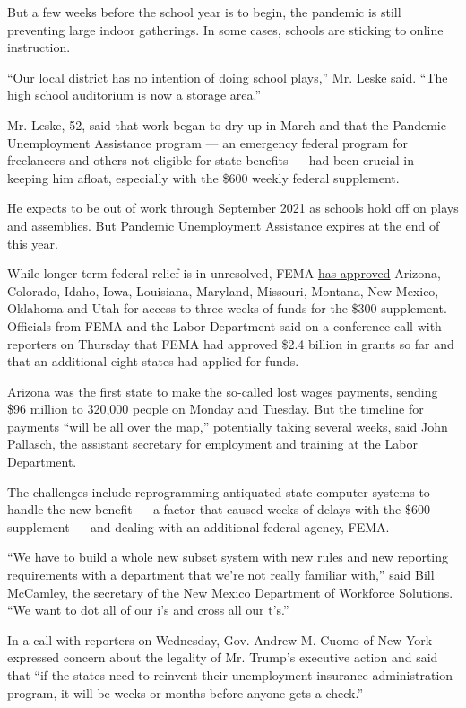 But a few weeks before the school year is to begin, the pandemic is
still preventing large indoor gatherings. In some cases, schools are
sticking to online instruction.

``Our local district has no intention of doing school plays,'' Mr. Leske
said. ``The high school auditorium is now a storage area.''

Mr. Leske, 52, said that work began to dry up in March and that the
Pandemic Unemployment Assistance program --- an emergency federal
program for freelancers and others not eligible for state benefits ---
had been crucial in keeping him afloat, especially with the \$600 weekly
federal supplement.

He expects to be out of work through September 2021 as schools hold off
on plays and assemblies. But Pandemic Unemployment Assistance expires at
the end of this year.

While longer-term federal relief is in unresolved, FEMA
\href{https://www.fema.gov/press-release/20200819/fema-announces-lost-wages-grant-maryland}{has
approved} Arizona, Colorado, Idaho, Iowa, Louisiana, Maryland, Missouri,
Montana, New Mexico, Oklahoma and Utah for access to three weeks of
funds for the \$300 supplement. Officials from FEMA and the Labor
Department said on a conference call with reporters on Thursday that
FEMA had approved \$2.4 billion in grants so far and that an additional
eight states had applied for funds.

Arizona was the first state to make the so-called lost wages payments,
sending \$96 million to 320,000 people on Monday and Tuesday. But the
timeline for payments ``will be all over the map,'' potentially taking
several weeks, said John Pallasch, the assistant secretary for
employment and training at the Labor Department.

The challenges include reprogramming antiquated state computer systems
to handle the new benefit --- a factor that caused weeks of delays with
the \$600 supplement --- and dealing with an additional federal agency,
FEMA.

``We have to build a whole new subset system with new rules and new
reporting requirements with a department that we're not really familiar
with,'' said Bill McCamley, the secretary of the New Mexico Department
of Workforce Solutions. ``We want to dot all of our i's and cross all
our t's.''

In a call with reporters on Wednesday, Gov. Andrew M. Cuomo of New York
expressed concern about the legality of Mr. Trump's executive action and
said that ``if the states need to reinvent their unemployment insurance
administration program, it will be weeks or months before anyone gets a
check.''

